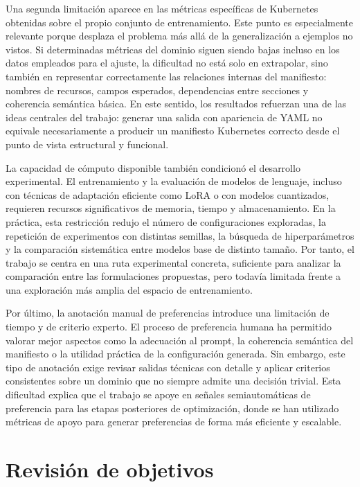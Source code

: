 Una segunda limitación aparece en las métricas específicas de Kubernetes obtenidas sobre el propio conjunto de entrenamiento.
Este punto es especialmente relevante porque desplaza el problema más allá de la generalización a ejemplos no vistos.
Si determinadas métricas del dominio siguen siendo bajas incluso en los datos empleados para el ajuste, la dificultad no
está solo en extrapolar, sino también en representar correctamente las relaciones internas del manifiesto: nombres de
recursos, campos esperados, dependencias entre secciones y coherencia semántica básica. En este sentido, los resultados
refuerzan una de las ideas centrales del trabajo: generar una salida con apariencia de YAML no equivale necesariamente
a producir un manifiesto Kubernetes correcto desde el punto de vista estructural y funcional.

La capacidad de cómputo disponible también condicionó el desarrollo experimental. El entrenamiento y la evaluación de
modelos de lenguaje, incluso con técnicas de adaptación eficiente como LoRA o con modelos cuantizados, requieren
recursos significativos de memoria, tiempo y almacenamiento. En la práctica, esta restricción redujo el número de
configuraciones exploradas, la repetición de experimentos con distintas semillas, la búsqueda de hiperparámetros y
la comparación sistemática entre modelos base de distinto tamaño. Por tanto, el trabajo se centra en una ruta
experimental concreta, suficiente para analizar la comparación entre las formulaciones propuestas, pero todavía
limitada frente a una exploración más amplia del espacio de entrenamiento.

Por último, la anotación manual de preferencias introduce una limitación de tiempo y de criterio experto. El proceso
de preferencia humana ha permitido valorar mejor aspectos como la adecuación al prompt, la coherencia semántica del
manifiesto o la utilidad práctica de la configuración generada. Sin embargo, este tipo de anotación exige revisar
salidas técnicas con detalle y aplicar criterios consistentes sobre un dominio que no siempre admite una decisión trivial.
Esta dificultad explica que el trabajo se apoye en señales semiautomáticas de preferencia para las etapas
posteriores de optimización, donde se han utilizado métricas de apoyo para generar preferencias de forma más eficiente y escalable.

\section{Revisión de objetivos}

